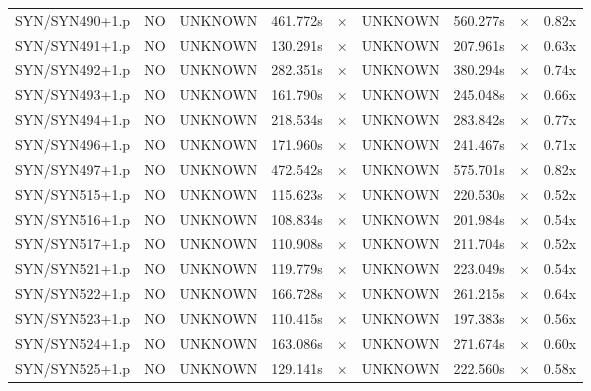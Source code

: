 \documentclass[a4paper,10pt]{article}
\begin{document}
\begin{longtable}{lcccccccc}
SYN/SYN490+1.p & NO & UNKNOWN & 461.772s & \cellcolor{mismatchcolor}$\times$ & UNKNOWN & 560.277s & \cellcolor{mismatchcolor}$\times$ & 0.82x \\
SYN/SYN491+1.p & NO & UNKNOWN & 130.291s & \cellcolor{mismatchcolor}$\times$ & UNKNOWN & 207.961s & \cellcolor{mismatchcolor}$\times$ & 0.63x \\
SYN/SYN492+1.p & NO & UNKNOWN & 282.351s & \cellcolor{mismatchcolor}$\times$ & UNKNOWN & 380.294s & \cellcolor{mismatchcolor}$\times$ & 0.74x \\
SYN/SYN493+1.p & NO & UNKNOWN & 161.790s & \cellcolor{mismatchcolor}$\times$ & UNKNOWN & 245.048s & \cellcolor{mismatchcolor}$\times$ & 0.66x \\
SYN/SYN494+1.p & NO & UNKNOWN & 218.534s & \cellcolor{mismatchcolor}$\times$ & UNKNOWN & 283.842s & \cellcolor{mismatchcolor}$\times$ & 0.77x \\
SYN/SYN496+1.p & NO & UNKNOWN & 171.960s & \cellcolor{mismatchcolor}$\times$ & UNKNOWN & 241.467s & \cellcolor{mismatchcolor}$\times$ & 0.71x \\
SYN/SYN497+1.p & NO & UNKNOWN & 472.542s & \cellcolor{mismatchcolor}$\times$ & UNKNOWN & 575.701s & \cellcolor{mismatchcolor}$\times$ & 0.82x \\
SYN/SYN515+1.p & NO & UNKNOWN & 115.623s & \cellcolor{mismatchcolor}$\times$ & UNKNOWN & 220.530s & \cellcolor{mismatchcolor}$\times$ & 0.52x \\
SYN/SYN516+1.p & NO & UNKNOWN & 108.834s & \cellcolor{mismatchcolor}$\times$ & UNKNOWN & 201.984s & \cellcolor{mismatchcolor}$\times$ & 0.54x \\
SYN/SYN517+1.p & NO & UNKNOWN & 110.908s & \cellcolor{mismatchcolor}$\times$ & UNKNOWN & 211.704s & \cellcolor{mismatchcolor}$\times$ & 0.52x \\
SYN/SYN521+1.p & NO & UNKNOWN & 119.779s & \cellcolor{mismatchcolor}$\times$ & UNKNOWN & 223.049s & \cellcolor{mismatchcolor}$\times$ & 0.54x \\
SYN/SYN522+1.p & NO & UNKNOWN & 166.728s & \cellcolor{mismatchcolor}$\times$ & UNKNOWN & 261.215s & \cellcolor{mismatchcolor}$\times$ & 0.64x \\
SYN/SYN523+1.p & NO & UNKNOWN & 110.415s & \cellcolor{mismatchcolor}$\times$ & UNKNOWN & 197.383s & \cellcolor{mismatchcolor}$\times$ & 0.56x \\
SYN/SYN524+1.p & NO & UNKNOWN & 163.086s & \cellcolor{mismatchcolor}$\times$ & UNKNOWN & 271.674s & \cellcolor{mismatchcolor}$\times$ & 0.60x \\
SYN/SYN525+1.p & NO & UNKNOWN & 129.141s & \cellcolor{mismatchcolor}$\times$ & UNKNOWN & 222.560s & \cellcolor{mismatchcolor}$\times$ & 0.58x \\

\end{longtable}
\end{document}
